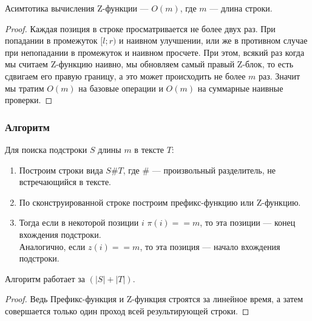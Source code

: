 \begin{prop}
	Асимтотика вычисления Z-функции --- $O(m)$, где $m$ --- длина строки.
\end{prop}
\begin{proof}
	Каждая позиция в строке просматривается не более двух раз. При попадании в промежуток $[l; r)$ и наивном улучшении, или же в противном случае при непопадании в промежуток и наивном просчете. При этом, всякий раз когда мы считаем Z-функцию наивно, мы обновляем самый правый Z-блок, то есть сдвигаем его правую границу, а это может происходить не более $m$ раз. Значит мы тратим $O(m)$ на базовые операции и $O(m)$ на суммарные наивные проверки.
\end{proof}

\newpage

\subsubsection{Алгоритм}
Для поиска подстроки $S$ длины $m$ в тексте  $T$:
\begin{enumerate}
	\item Построим строки вида $S\#T$, где $\#$ --- произвольный разделитель, не встречающийся в тексте.
	\item По сконструированной строке построим префикс-функцию или Z-функцию.
	\item Тогда если в некоторой позиции  $i$ $\pi(i) == m$, то эта позиции --- конец вхождения подстроки. \\
		Аналогично, если $z(i) == m$, то эта позиция --- начало вхождения подстроки.
\end{enumerate}

\begin{prop}
	Алгоритм работает за $(\lvert S \rvert + \lvert T \rvert)$.
\end{prop}
\begin{proof}
	Ведь Префикс-функция и Z-функция строятся за линейное время, а затем совершается только один проход всей результирующей строки.	
\end{proof}
